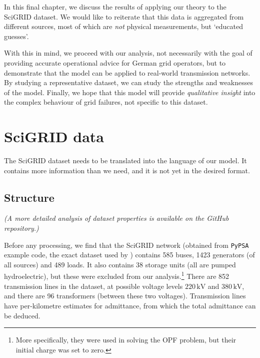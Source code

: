 \documentclass[main.tex]{subfiles}
\begin{document}
In this final chapter, we discuss the results of applying our theory to the SciGRID dataset. We would like to reiterate that this data is aggregated from different sources, most of which are \emph{not} physical measurements, but `educated guesses'.

With this in mind, we proceed with our analysis, not necessarily with the goal of providing accurate operational advice for German grid operators, but to demonstrate that the model can be applied to real-world transmission networks. By studying a representative dataset, we can study the strengths and weaknesses of the model. Finally, we hope that this model will provide \emph{qualitative insight} into the complex behaviour of grid failures, not specific to this dataset.


\section{SciGRID data}
The SciGRID dataset needs to be translated into the language of our model. It contains more information than we need, and it is not yet in the desired format. 

\subsection{Structure}
\emph{(A more detailed analysis of dataset properties is available on the GitHub repository.)}

Before any processing, we find that the SciGRID network (obtained from \texttt{PyPSA} example code, the exact dataset used by \cite{Nesti2018emergentfailures}) contains 585 buses, 1423 generators (of all sources) and 489 loads. It also contains 38 storage units (all are pumped hydroelectric), but these were excluded from our analysis.\footnote{More specifically, they were used in solving the OPF problem, but their initial charge was set to zero.} There are 852 transmission lines in the dataset, at possible voltage levels $220 \, \si{\kilo\volt}$ and $380 \, \si{\kilo\volt}$, and there are 96 transformers (between these two voltages). Transmission lines have per-kilometre estimates for admittance, from which the total admittance can be deduced.
\end{document}
